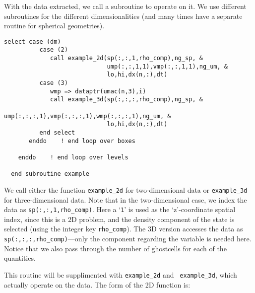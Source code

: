 With the data extracted, we call a subroutine to operate on it.  We use
different subroutines for the different dimensionalities (and many times
have a separate routine for spherical geometries).
\begin{lstlisting}[language={[95]fortran},mathescape=false]
          select case (dm)
          case (2)
             call example_2d(sp(:,:,1,rho_comp),ng_sp, &
                             ump(:,:,1,1),vmp(:,:,1,1),ng_um, &
                             lo,hi,dx(n,:),dt)
          case (3)
             wmp => dataptr(umac(n,3),i)
             call example_3d(sp(:,:,:,rho_comp),ng_sp, &
                             ump(:,:,:,1),vmp(:,:,:,1),wmp(:,:,:,1),ng_um, &
                             lo,hi,dx(n,:),dt)
          end select
       enddo    ! end loop over boxes

    enddo    ! end loop over levels

  end subroutine example
\end{lstlisting}
\noindent We call either the function
{\tt example\_2d} for two-dimensional data or {\tt example\_3d}
for three-dimensional data.  Note that in the two-dimensional
case, we index the data as {\tt sp(:,:,1,rho\_comp)}.  Here a
`{\tt 1}' is used as the `z'-coordinate spatial index, since this
is a 2D problem, and the density component of the state is selected
(using the integer key {\tt rho\_comp}).  The 3D version accesses
the data as {\tt sp(:,:,:,rho\_comp)}---only the component regarding
the variable is needed here.  Notice that we also pass through
the number of ghostcells for each of the quantities.

This routine will be supplimented with {\tt example\_2d} and {\tt
example\_3d}, which actually operate on the data.  The form of 
the 2D function is:


